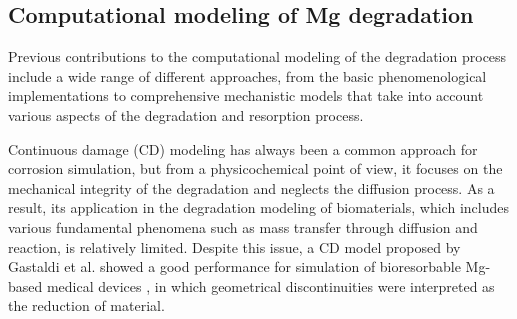 \subsection{Computational modeling of Mg degradation}

Previous contributions to the computational modeling of the degradation process include a wide range of different approaches, from the basic phenomenological implementations to comprehensive mechanistic models that take into account various aspects of the degradation and resorption process.


Continuous damage (CD) modeling has always been a common approach for corrosion simulation, but from a physicochemical point of view, it focuses on the mechanical integrity of the degradation and neglects the diffusion process. As a result, its application in the degradation modeling of biomaterials, which includes various fundamental phenomena such as mass transfer through diffusion and reaction, is relatively limited. Despite this issue, a CD model proposed by Gastaldi et al. showed a good performance for simulation of bioresorbable Mg-based medical devices \cite{Gastaldi2011},
in which geometrical discontinuities were interpreted as the reduction of material.

